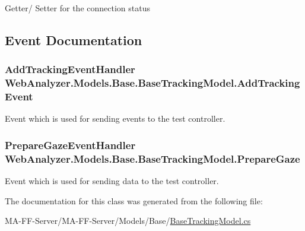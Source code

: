 Getter/ Setter for the connection status 



\subsection{Event Documentation}
\hypertarget{class_web_analyzer_1_1_models_1_1_base_1_1_base_tracking_model_a3c003ad3cd3902810994f53409a6aeb7}{}
\subsubsection[{Add\+Tracking\+Event}]{\setlength{\rightskip}{0pt plus 5cm}Add\+Tracking\+Event\+Handler Web\+Analyzer.\+Models.\+Base.\+Base\+Tracking\+Model.\+Add\+Tracking\+Event}\label{class_web_analyzer_1_1_models_1_1_base_1_1_base_tracking_model_a3c003ad3cd3902810994f53409a6aeb7}


Event which is used for sending events to the test controller. 

\hypertarget{class_web_analyzer_1_1_models_1_1_base_1_1_base_tracking_model_acf17194aca2875e9f69c15772af39417}{}
\subsubsection[{Prepare\+Gaze}]{\setlength{\rightskip}{0pt plus 5cm}Prepare\+Gaze\+Event\+Handler Web\+Analyzer.\+Models.\+Base.\+Base\+Tracking\+Model.\+Prepare\+Gaze}\label{class_web_analyzer_1_1_models_1_1_base_1_1_base_tracking_model_acf17194aca2875e9f69c15772af39417}


Event which is used for sending data to the test controller. 



The documentation for this class was generated from the following file\+:\begin{DoxyCompactItemize}
\item 
M\+A-\/\+F\+F-\/\+Server/\+M\+A-\/\+F\+F-\/\+Server/\+Models/\+Base/\hyperlink{_base_tracking_model_8cs}{Base\+Tracking\+Model.\+cs}\end{DoxyCompactItemize}
